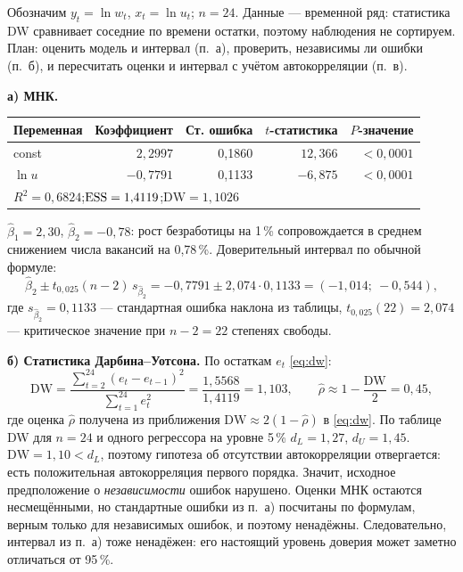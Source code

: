 \begin{solution}
Обозначим $y_t=\ln w_t$, $x_t=\ln u_t$; $n=24$. Данные — временной ряд:
статистика DW сравнивает соседние по времени остатки, поэтому наблюдения
не сортируем. План: оценить модель и интервал (п.~а), проверить, независимы ли
ошибки (п.~б), и пересчитать оценки и интервал с учётом автокорреляции (п.~в).

\medskip
\textbf{а) МНК.}
\begin{center}
\begin{tabular}{lrrrr}
\toprule
Переменная & Коэффициент & Ст. ошибка & $t$-статистика & $P$-значение \\
\midrule
const   & $\phantom{-}2{,}2997$ & 0,1860 & $12{,}366$ & $<0{,}0001$ \\
$\ln u$ & $-0{,}7791$ & 0,1133 & $-6{,}875$ & $<0{,}0001$ \\
\midrule
\multicolumn{5}{l}{$R^2 = 0{,}6824$;\quad $\mathrm{ESS} = 1{,}4119$;\quad $\mathrm{DW} = 1{,}1026$} \\
\bottomrule
\end{tabular}
\end{center}
$\widehat{\beta}_1 = 2{,}30$, $\widehat{\beta}_2 = -0{,}78$: рост безработицы
на 1\,\% сопровождается в среднем снижением числа вакансий на 0,78\,\%.
Доверительный интервал по обычной формуле:
\[
  \widehat{\beta}_2 \pm t_{0{,}025}(n-2)\,s_{\widehat{\beta}_2}
  = -0{,}7791 \pm 2{,}074\cdot 0{,}1133 = (-1{,}014;\ -0{,}544),
\]
где $s_{\widehat\beta_2} = 0{,}1133$ — стандартная ошибка наклона из
таблицы, $t_{0{,}025}(22) = 2{,}074$ — критическое значение при
$n - 2 = 22$ степенях свободы.

\medskip
\textbf{б) Статистика Дарбина--Уотсона.} По остаткам $e_t$ \eqref{eq:dw}:
\[
  \mathrm{DW} = \frac{\sum_{t=2}^{24}(e_t - e_{t-1})^2}{\sum_{t=1}^{24}e_t^2}
              = \frac{1{,}5568}{1{,}4119} = 1{,}103,
  \qquad
  \widehat{\rho} \approx 1 - \frac{\mathrm{DW}}{2} = 0{,}45 ,
\]
где оценка $\widehat\rho$ получена из приближения
$\mathrm{DW} \approx 2(1 - \widehat\rho)$ в \eqref{eq:dw}. По таблице DW
для $n = 24$ и одного регрессора на уровне 5\,\% $d_L = 1{,}27$,
$d_U = 1{,}45$. $\mathrm{DW} = 1{,}10 < d_L$, поэтому гипотеза об отсутствии
автокорреляции отвергается: есть положительная автокорреляция первого
порядка. Значит, исходное предположение о \emph{независимости} ошибок
нарушено. Оценки МНК остаются несмещёнными, но стандартные ошибки из п.~а)
посчитаны по формулам, верным только для независимых ошибок, и поэтому
ненадёжны. Следовательно, интервал из п.~а) тоже ненадёжен: его настоящий
уровень доверия может заметно отличаться от 95\,\%.


\end{solution}
